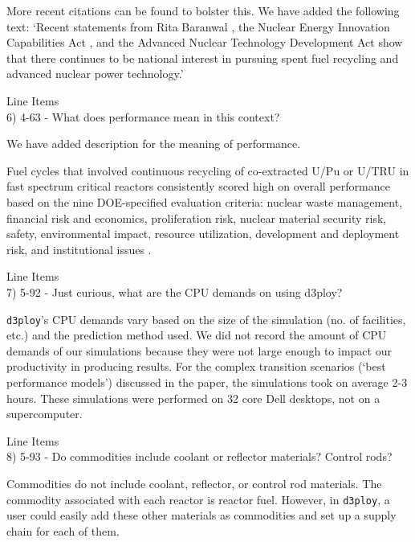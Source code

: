 \documentclass[answers,11pt]{exam}
\newcommand{\deploy}{\texttt{d3ploy}\xspace}%
\begin{document}
\begin{questions}
\begin{solution}
More recent citations can be found to bolster this. We have added the following text: 
`Recent statements from Rita Baranwal \cite{noauthor_new_2019}, the Nuclear Energy Innovation 
Capabilities Act \cite{crapo_s97_2018}, and the Advanced Nuclear Technology Development Act \cite{latta_hr590_2017} 
show that there continues to be national interest in pursuing spent fuel recycling and advanced nuclear power 
technology.'
\end{solution}

\question Line Items \\
6) 4-63 - What does performance mean in this context?

\begin{solution}
We have added description for the meaning of performance. 

Fuel cycles that involved continuous recycling
of co-extracted U/Pu or U/TRU in fast spectrum critical reactors
consistently scored high on overall performance based on the nine 
DOE-specified evaluation criteria: nuclear waste management, 
financial risk and economics, 
proliferation risk, nuclear material security risk, safety, 
environmental impact, resource utilization, development and deployment 
risk, and institutional issues \cite{wigeland_nuclear_2014}. 
\end{solution}

\question Line Items \\
7) 5-92 - Just curious, what are the CPU demands on using d3ploy?

\begin{solution}
\deploy's CPU demands vary based on the size of the simulation (no. of facilities, etc.) 
and the prediction method used. We did not record the amount of CPU demands of our simulations 
because they were not large enough to impact our productivity in producing results. 
For the complex transition scenarios (`best performance models') discussed in the paper, 
the simulations took on average 2-3 hours. These simulations were performed on 32 core 
Dell desktops, not on a supercomputer. 
\end{solution}

\question Line Items \\
8) 5-93 - Do commodities include coolant or reflector materials? Control rods?
\begin{solution}
Commodities do not include coolant, reflector, or control rod materials. The commodity associated 
with each reactor is reactor fuel. However, in \deploy, a user could easily add these other 
materials as commodities and set up a supply chain for each of them.  
\end{solution}


\end{questions}
\end{document}
